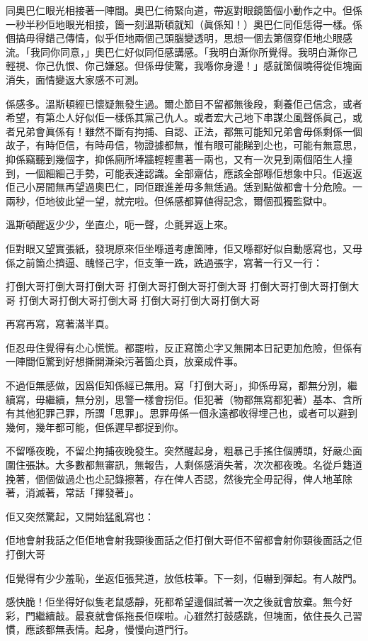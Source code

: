 同奧巴仁眼光相接著一陣間。奧巴仁徛緊向道，帶返對眼鏡箇個小動作之中。但係一秒半秒佢地眼光相接，箇一刻溫斯頓就知（眞係知！）奧巴仁同佢恁得一樣。係個搞毋得錯己傳情，似乎佢地兩個己頭腦變透明，思想一個去第個穿佢地尐眼感流。「我同你同意，」奧巴仁好似同佢感講感。「我明白澌你所覺得。我明白澌你己輕視、你己仇恨、你己嫌惡。但係毋使驚，我喺你身邊！」感就箇個曉得從佢塊面消失，面情變返大家感不可測。

係感多。溫斯頓經已懷疑無發生過。爾尐節目不留都無後段，剩養佢己信念，或者希望，有第尐人好似佢一樣係其黨己仇人。或者宏大己地下串謀尐風聲係眞己，或者兄弟會眞係有！雖然不斷有拘捕、自認、正法，都無可能知兄弟會毋係剩係一個故子，有時佢信，有時毋信，物證據都無，惟有眼可能睇到尐也，可能有無意思，抑係竊聽到幾個字，抑係廁所埲牆輕輕畫著一兩也，又有一次見到兩個陌生人撞到，一個細細己手勢，可能表達認識。全部齋估，應該全部喺佢想𧰼中只。佢返返佢己小房間無再望過奧巴仁，同佢跟進差毋多無恁過。恁到點做都會十分危險。一兩秒，佢地彼此望一望，就完啦。但係感都算値得記念，爾個孤獨監獄中。

溫斯頓醒返少少，坐直尐，呃一聲，尐氈昇返上來。

佢對眼又望實張紙，發現原來佢坐喺道考慮箇陣，佢又喺都好似自動感寫也，又毋係之前箇尐擠逼、醜怪己字，佢支筆一跣，跣過張字，寫著一行又一行：

	打倒大哥打倒大哥打倒大哥
	打倒大哥打倒大哥打倒大哥
	打倒大哥打倒大哥打倒大哥
	打倒大哥打倒大哥打倒大哥
	打倒大哥打倒大哥打倒大哥

再寫再寫，寫著滿半頁。

佢忍毋住覺得有尐心慌慌。都罷啦，反正寫箇尐字又無開本日記更加危險，但係有一陣間佢驚到好想撕開澌染污著箇尐頁，放棄成件事。

不過佢無感做，因爲佢知係經已無用。寫「打倒大哥」，抑係毋寫，都無分別，繼續寫，毋繼續，無分別，思警一樣會拐佢。佢犯著（物都無寫都犯著）基本、含所有其他犯罪己罪，所謂「思罪」。思罪毋係一個永遠都收得埋己也，或者可以避到幾何，幾年都可能，但係遲早都捉到你。

不留喺夜晚，不留尐拘捕夜晚發生。突然醒起身，粗暴己手搖住個膊頭，好嚴尐面圍住張牀。大多數都無審訊，無報告，人剩係感消失著，次次都夜晚。名從戶籍道挽著，個個做過尐也尐記錄擦著，存在俾人否認，然後完全毋記得，俾人地革除著，消滅著，常話「揮發著」。

佢又突然驚起，又開始猛亂寫也：

佢地會射我話之佢佢地會射我頸後面話之佢打倒大哥佢不留都會射你頸後面話之佢打倒大哥

佢覺得有少少羞恥，坐返佢張凳道，放低枝筆。下一刻，佢嚇到彈起。有人敲門。

感快脆！佢坐得好似隻老鼠感靜，死都希望邊個試著一次之後就會放棄。無今好彩，門繼續敲。最衰就會係拖長佢㗎啦。心雖然打鼓感跳，但塊面，依住長久己習慣，應該都無表情。起身，慢慢向道門行。
